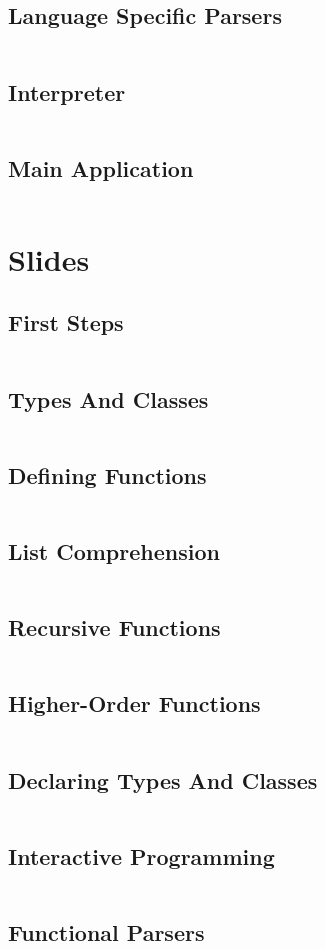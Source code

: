 \documentclass[a4paper,9pt,twoside]{book}
\newcommand{\hsfile}[1]{\inputminted[breaklines]{haskell}{../haskell/#1.hs}}
\begin{document}
\section{Language Specific Parsers}
\hsfile{vcg/Parser}
\section{Interpreter}
\hsfile{vcg/Interpreter}
\section{Main Application}
\hsfile{vcg/Main}

\chapter{Slides}
\section{First Steps}
\hsfile{slides/1_first_steps}
\section{Types And Classes}
\hsfile{slides/2_types_and_classes}
\section{Defining Functions}
\hsfile{slides/3_defining_functions}
\section{List Comprehension}
\hsfile{slides/4_list_comprehension}
\section{Recursive Functions}
\hsfile{slides/5_recursive_functions}
\section{Higher-Order Functions}
\hsfile{slides/6_higher-order_functions}
\section{Declaring Types And Classes}
\hsfile{slides/7_declaring_types_and_classes}
\section{Interactive Programming}
\hsfile{slides/8_interactive_programming}
\section{Functional Parsers}
\hsfile{slides/9_functional_parsers}
\end{document}
